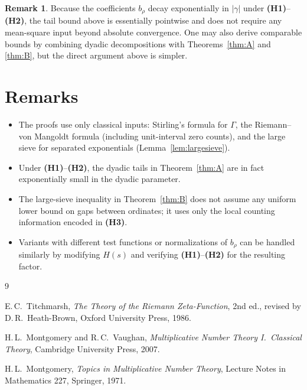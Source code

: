 \documentclass[11pt]{article}
\theoremstyle{plain}
\theoremstyle{definition}
\newtheorem{remark}[theorem]{Remark}
\begin{document}
\begin{remark}
Because the coefficients $b_\rho$ decay exponentially in $|\gamma|$ under \textbf{(H1)}--\textbf{(H2)}, the tail bound above is essentially pointwise and does not require any mean-square input beyond absolute convergence. One may also derive comparable bounds by combining dyadic decompositions with Theorems~\ref{thm:A} and \ref{thm:B}, but the direct argument above is simpler.
\end{remark}

\section{Remarks}

\begin{itemize}
  \item The proofs use only classical inputs: Stirling's formula for $\Gamma$, the Riemann--von Mangoldt formula (including unit-interval zero counts), and the large sieve for separated exponentials (Lemma~\ref{lem:largesieve}).
  \item Under \textbf{(H1)}--\textbf{(H2)}, the dyadic tails in Theorem~\ref{thm:A} are in fact exponentially small in the dyadic parameter.
  \item The large-sieve inequality in Theorem~\ref{thm:B} does not assume any uniform lower bound on gaps between ordinates; it uses only the local counting information encoded in \textbf{(H3)}.
  \item Variants with different test functions or normalizations of $b_\rho$ can be handled similarly by modifying $H(s)$ and verifying \textbf{(H1)}--\textbf{(H2)} for the resulting factor.
\end{itemize}

\begin{thebibliography}{9}

E.\,C.~Titchmarsh,
\emph{The Theory of the Riemann Zeta-Function},
2nd ed., revised by D.\,R.~Heath-Brown,
Oxford University Press, 1986.

H.\,L.~Montgomery and R.\,C.~Vaughan,
\emph{Multiplicative Number Theory I.\ Classical Theory},
Cambridge University Press, 2007.

H.\,L.~Montgomery,
\emph{Topics in Multiplicative Number Theory},
Lecture Notes in Mathematics 227,
Springer, 1971.

\end{thebibliography}
\end{document}
